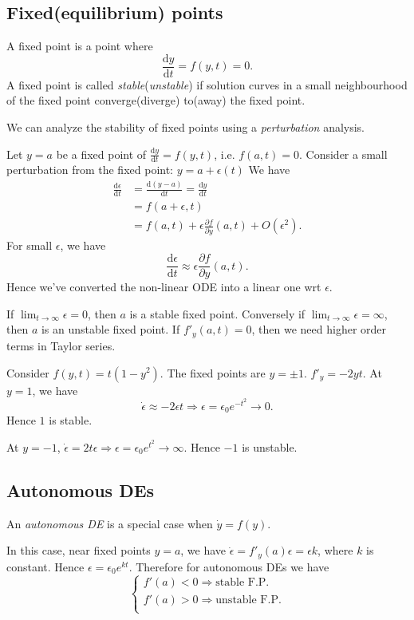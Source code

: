 \documentclass[a4paper]{article}
\begin{document}
    \subsection{Fixed(equilibrium) points}
    \begin{definition}
        A fixed point is a point where
        \[
            \frac{\mathrm{d}y}{\mathrm{d}t}=f(y,t)=0 
        .\]
        A fixed point is called \textit{stable}(\textit{unstable}) if solution curves in a small neighbourhood of the fixed point converge(diverge) to(away) the fixed point.
    \end{definition}
    We can analyze the stability of fixed points using a \textit{perturbation} analysis.

    Let $y=a$ be a fixed point of $ \frac{\mathrm{d}y}{\mathrm{d}t}=f(y,t)  $, i.e. $ f(a,t)=0 $. Consider a small perturbation from the fixed point: $ y=a+\epsilon(t) $ We have 
    \[
        \begin{aligned}
            \frac{\mathrm{d}\epsilon}{\mathrm{d}t}&=\frac{\mathrm{d}(y-a)}{\mathrm{d}t}
            = \frac{\mathrm{d}y}{\mathrm{d}t}\\
            &=f(a+\epsilon,t)\\
            &= f(a,t)+\epsilon \frac{\partial f}{\partial y}(a,t)+O(\epsilon^2).
        \end{aligned}
    \]
    For small $ \epsilon $, we have 
    \[
        \frac{\mathrm{d}\epsilon}{\mathrm{d}t}\approx \epsilon \frac{\partial f}{\partial y}(a,t)  
    .\]
    Hence we've converted the non-linear ODE into a linear one wrt $ \epsilon $.

    If $ \lim_{t \to \infty} \epsilon=0 $, then $a$ is a stable fixed point. Conversely if $ \lim_{t \to \infty} \epsilon=\infty  $, then $a$ is an unstable fixed point. If $ f'_y(a,t)=0 $, then we need higher order terms in Taylor series.
    \begin{example}
        Consider $f(y,t)=t(1-y^2)$. The fixed points are $y=\pm 1$. $ f'_y=-2yt $. At $y=1$, we have 
        \[
            \dot{\epsilon}\approx -2\epsilon t \Rightarrow \epsilon=\epsilon_0 e^{-t^2}\to 0
        .\] 
        Hence $1$ is stable.
        
        At $y=-1$, $ \dot{\epsilon}=2t\epsilon \Rightarrow \epsilon=\epsilon_0e^{t^2}\to \infty $. Hence $-1$ is unstable.
    \end{example}
    \subsection{Autonomous DEs}
    \begin{definition}
        An \textit{autonomous DE} is a special case when $\dot{y}=f(y)$.
    \end{definition}
    In this case, near fixed points $ y=a$, we have $ \dot{\epsilon}=f'_y(a)\epsilon=\epsilon k $, where $k$ is constant. Hence $ \epsilon=\epsilon_0 e^{kt} $. Therefore for autonomous DEs we have 
    \[
      \begin{cases}
      f'(a)<0 \Rightarrow \text{stable F.P.}\\
       f'(a)>0 \Rightarrow \text{unstable F.P.}\\
      \end{cases}   
    \]
\end{document}
